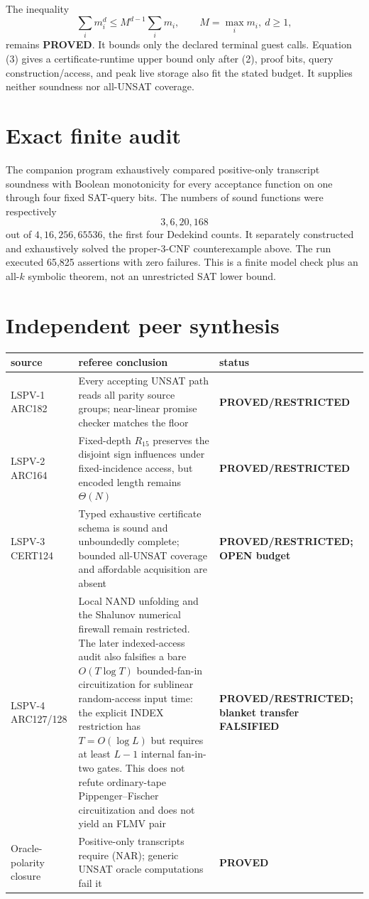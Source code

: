 \documentclass[11pt]{article}
\newcommand{\status}[1]{\textbf{#1}}
\begin{document}
The inequality
\[
 \sum_i m_i^d\le M^{d-1}\sum_i m_i,
 \qquad M=\max_i m_i,\ d\ge1,                              \tag{3}
\]
remains \status{PROVED}.  It bounds only the declared terminal guest calls.
Equation (3) gives a certificate-runtime upper bound only after (2), proof
bits, query construction/access, and peak live storage also fit the stated
budget.  It supplies neither soundness nor all-UNSAT coverage.

\section*{Exact finite audit}
The companion program exhaustively compared positive-only transcript
soundness with Boolean monotonicity for every acceptance function on one
through four fixed SAT-query bits.  The numbers of sound functions were
respectively
\[
             3, 6, 20, 168
\]
out of $4,16,256,65536$, the first four Dedekind counts.  It separately
constructed and exhaustively solved the proper-3-CNF counterexample above.
The run executed 65,825 assertions with zero failures.  This is a finite model
check plus an all-$k$ symbolic theorem, not an unrestricted SAT lower bound.

\section*{Independent peer synthesis}
\begin{center}
\begin{tabularx}{.97\linewidth}{@{}p{.16\linewidth}X p{.20\linewidth}@{}}
\toprule
source & referee conclusion & status\\
\midrule
LSPV-1 ARC182 & Every accepting UNSAT path reads all parity source groups;
near-linear promise checker matches the floor & \status{PROVED/RESTRICTED}\\
LSPV-2 ARC164 & Fixed-depth $R_{15}$ preserves the disjoint sign influences
under fixed-incidence access, but encoded length remains $\Theta(N)$ &
\status{PROVED/RESTRICTED}\\
LSPV-3 CERT124 & Typed exhaustive certificate schema is sound and unboundedly
complete; bounded all-UNSAT coverage and affordable acquisition are absent &
\status{PROVED/RESTRICTED; OPEN budget}\\
LSPV-4 ARC127/128 & Local NAND unfolding and the Shalunov numerical firewall
remain restricted.  The later indexed-access audit also falsifies a bare
$O(T\log T)$ bounded-fan-in circuitization for sublinear random-access input
time: the explicit INDEX restriction has $T=O(\log L)$ but requires at least
$L-1$ internal fan-in-two gates.  This does not refute ordinary-tape
Pippenger--Fischer circuitization and does not yield an FLMV pair &
\status{PROVED/RESTRICTED; blanket transfer FALSIFIED}\\
Oracle-polarity closure & Positive-only transcripts require (NAR); generic
UNSAT oracle computations fail it & \status{PROVED}\\
\bottomrule
\end{tabularx}
\end{center}
\end{document}

